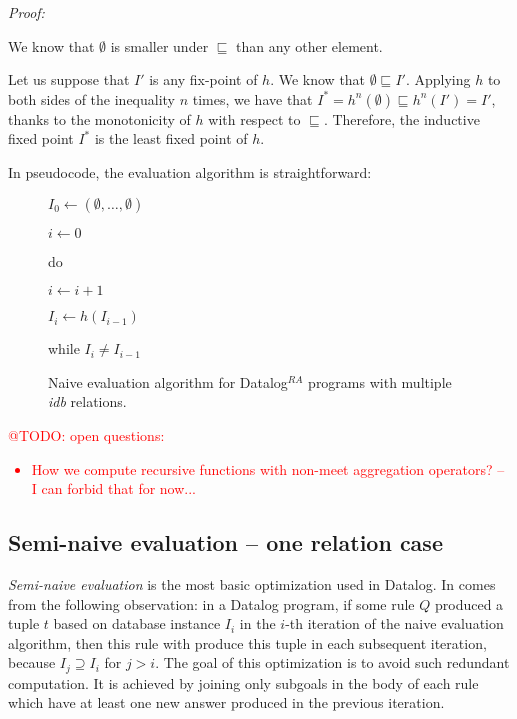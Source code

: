 \documentclass{pracamgr}
\makeatletter
\theoremstyle{plain}
\theoremstyle{definition}
\theoremstyle{remark}
\newcommand{\todo}[1]{\textcolor{red}{@TODO: #1}}
\newcommand{\datalogra}{Datalog$^{RA}$ }
\newcommand{\narrow}[1]{\begin{changemargin}{2cm}{2cm} #1 \end{changemargin}}
\makeatother
\begin{document}
\emph{Proof:} 

We know that $\emptyset$ is smaller under $\sqsubseteq$ than any other element.

Let us suppose that $I'$ is any fix-point of $h$.  We know that $\emptyset \sqsubseteq I'$. Applying $h$ to both sides of the inequality $n$ times, we have that $I^* = h^n(\emptyset) \sqsubseteq h^n(I') = I'$, thanks to the monotonicity of $h$ with respect to $\sqsubseteq$. Therefore, the inductive fixed point $I^*$ is the least fixed point of $h$.

In pseudocode, the evaluation algorithm is straightforward:

\begin{figure}[h!]
\narrow{
$I_0 \leftarrow (\emptyset, \dots, \emptyset)$

$i \leftarrow 0$

do

{\addtolength{\leftskip}{5mm}

$i \leftarrow i + 1$

$I_i \leftarrow h(I_{i-1})$

}

while $I_i \ne I_{i-1}$

\caption{Naive evaluation algorithm for \datalogra programs with multiple \textit{idb} relations.}
}
\end{figure}


\todo{open questions:
\begin{itemize}
\item How we compute recursive functions with non-meet aggregation operators? -- I can forbid that for now...
\end{itemize}
}


\subsection{Semi-naive evaluation -- one relation case}
\emph{Semi-naive evaluation} is the most basic optimization used in Datalog. In comes from the following observation: in a Datalog program, if some rule $Q$ produced a tuple $t$ based on database instance $I_i$ in the $i$-th iteration of the naive evaluation algorithm, then this rule with produce this tuple in each subsequent iteration, because $I_j \supseteq I_i$ for $j > i$. The goal of this optimization is to avoid such redundant computation. It is achieved by joining only subgoals in the body of each rule which have at least one new answer produced in the previous iteration.
\end{document}

